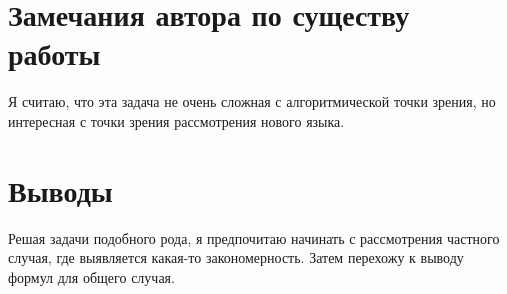 \documentclass[12pt]{article}
\begin{document}
\section{Замечания автора по существу работы}
Я считаю, что эта задача не очень сложная с алгоритмической точки зрения, но интересная с точки зрения рассмотрения нового языка.

\section{Выводы}
Решая задачи подобного рода, я предпочитаю начинать с рассмотрения частного случая, где выявляется какая-то закономерность. Затем перехожу к выводу формул для общего случая.
\end{document}

